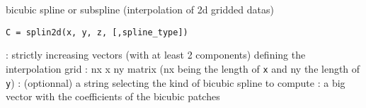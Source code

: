 
\begin{mandesc}
   {bicubic spline or subspline (interpolation of 2d
    gridded datas)}
\end{mandesc}

\begin{calling_sequence}
\begin{verbatim}
C = splin2d(x, y, z, [,spline_type])
\end{verbatim}
\end{calling_sequence}

\begin{parameters}
  \begin{varlist}
    : strictly increasing vectors (with at least 2 components)
               defining the interpolation grid
    : nx x ny matrix (nx being the length of \verb!x! and 
               ny the length of \verb!y!)
    : (optionnal) a string selecting the kind of bicubic spline to compute
    : a big vector with the coefficients of the bicubic patches
  \end{varlist}
\end{parameters}

